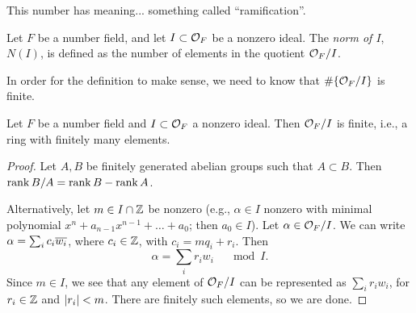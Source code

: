 {\color{airforceblue} This number has meaning... something called ``ramification''.}

\begin{definition} \label{defn:norm_of_ideal}
    Let $F$ be a number field, and let $I \subset \mathcal O_F$ be a nonzero ideal. The \textit{norm of $I$}, $N(I)$, is defined as the number of elements in the quotient $\mathcal O_F/I$.
\end{definition}

In order for the definition to make sense, we need to know that $\#\{\mathcal O_F/I\}$ is finite.
\begin{proposition} \label{prop:quotient_of_ring_of_integers_by_ideal_is_finite} %
    Let $F$ be a number field and $I \subset \mathcal O_F$ a nonzero ideal. Then $\mathcal O_F/I$ is finite, i.e., a ring with finitely many elements.
\end{proposition}
\begin{proof}
    Let $A, B$ be finitely generated abelian groups such that $A \subset B$. Then $\operatorname{rank} B/A = \operatorname{rank} B - \operatorname{rank} A$.

    Alternatively, let $m \in I \cap \mathbb Z$ be nonzero (e.g., $\alpha \in I$ nonzero with minimal polynomial $x^n + a_{n-1} x^{n-1} + \dots + a_0$; then $a_0 \in I$). Let $\alpha \in \mathcal O_F/I$. We can write $\alpha = \sum_i c_i \overline{w_i}$, where $c_i \in \mathbb Z$, with $c_i = m q_i + r_i$. Then
    \[ \alpha = \sum_i r_i w_i \quad \mod I. \]
    Since $m \in I$, we see that any element of $\mathcal O_F/I$ can be represented as $\sum_i r_i w_i$, for $r_i \in \mathbb Z$ and $\left\lvert r_i \right\rvert < m$. There are finitely such elements, so we are done.
\end{proof}